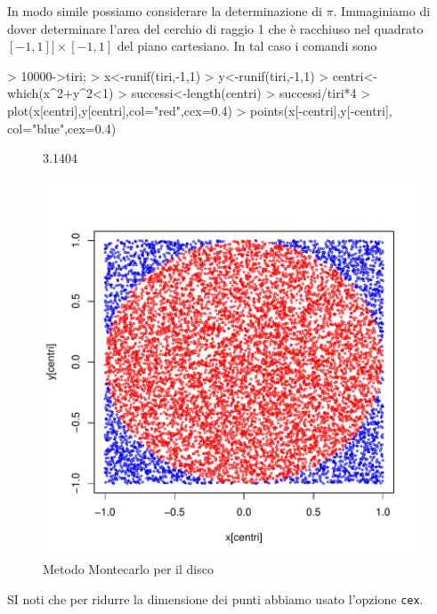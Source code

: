 \documentclass[onecolumn,11pt]{book}
\begin{document}
In modo simile possiamo considerare la determinazione di $\pi$. Immaginiamo di dover determinare l'area del cerchio di raggio 1 che \`e racchiuso nel quadrato $[-1,1]]\times[-1,1]$ del piano cartesiano.
In tal caso i comandi sono
\begin{Schunk}
\begin{Sinput}
> 10000->tiri;
> x<-runif(tiri,-1,1)		 
> y<-runif(tiri,-1,1)
> centri<-which(x^2+y^2<1)	 
> successi<-length(centri)
> successi/tiri*4                    
> plot(x[centri],y[centri],col="red",cex=0.4)   
> points(x[-centri],y[-centri], col="blue",cex=0.4)  
\end{Sinput}
\end{Schunk}
\begin{figure}[htbp]
\begin{center}
\begin{Schunk}
\begin{Soutput}
[1] 3.1404
\end{Soutput}
\end{Schunk}
\includegraphics{statisticaconR-122}
\caption{Metodo Montecarlo per il disco}
\label{fig:newton}
\end{center}
\end{figure}
 SI noti che per ridurre la dimensione dei punti abbiamo usato l'opzione \texttt{cex}.
\end{document}
